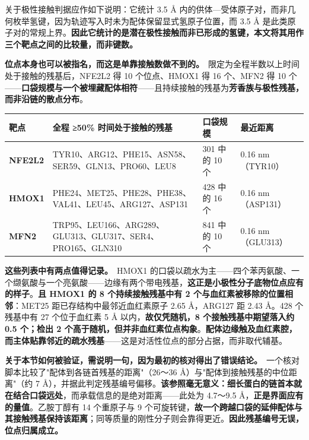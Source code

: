 \documentclass[UTF8,fontset=windows,11pt]{ctexart}
\begin{document}
关于极性接触判据应作如下说明：它统计 3.5 Å 内的供体—受体原子对，而非几何枚举氢键，因为轨迹写入时未为配体保留显式氢原子位置，而 3.5 Å 是此类原子对的常规上界。\textbf{因此它统计的是潜在极性接触而非已形成的氢键，本文将其用作三个靶点之间的比较量，而非键数。}

\textbf{位点本身也可以被指名，而这是单靠接触数做不到的。}\ 限定为全程半数以上时间处于接触的残基后，NFE2L2 得 10 个位点、HMOX1 得 16 个、MFN2 得 10 个——\textbf{口袋规模与一个被埋藏配体相符}——且持续接触的残基为\textbf{芳香族与极性残基，而非沿链的散点分布}。

\begin{center}
\small
\begin{longtable}{p{}p{}p{}p{}}
\hline
靶点 & 全程 ≥50\% 时间处于接触的残基 & 口袋规模 & 最近距离 \\
\hline
\textbf{NFE2L2} & TYR10、ARG12、PHE15、ASN58、SER59、GLN13、PRO60、LEU8 & 301 中的 10 个 & 0.16 nm（TYR10） \\
\textbf{HMOX1} & PHE24、MET25、PHE28、PHE38、VAL41、LEU45、ARG127、ASP131 & 428 中的 16 个 & 0.16 nm（ASP131） \\
\textbf{MFN2} & TRP95、LEU166、ARG289、GLU313、GLU317、SER4、PRO165、GLN310 & 841 中的 10 个 & 0.16 nm（GLU313） \\
\hline
\end{longtable}
\end{center}

\textbf{这些列表中有两点值得记录。}\ HMOX1 的口袋以疏水为主——四个苯丙氨酸、一个缬氨酸与一个亮氨酸——边缘有两个带电残基，\textbf{这正是小极性分子底物位点应有的样子}。\textbf{且 HMOX1 的 8 个持续接触残基中有 2 个与血红素被移除的位置相邻}：MET25 距已存结构中最邻近血红素原子 2.65 Å，ARG127 距 2.43 Å。428 个残基中有 27 个位于血红素 5 Å 以内，\textbf{故仅凭随机，8 个接触残基中期望落入约 0.5 个；检出 2 个高于随机，但并非血红素位点构象}。\textbf{配体边缘触及血红素腔，而主体贴靠邻近的疏水残基}——这是对活性位点的部分占据，而非取代辅基。

\textbf{关于本节如何被验证，需说明一句，因为最初的核对得出了错误结论。}\ 一个核对脚本比较了"配体到各链首残基的距离"（26～36 Å）与"配体到接触残基的中位距离"（约 7 Å），并据此判定残基编号偏移。\textbf{该参照毫无意义：细长蛋白的链首本就在结合口袋远处}，而承载信息的是绝对距离——此处为 4.7～9.5 Å，\textbf{正是界面应有的量值}。乙胺丁醇有 14 个重原子与 9 个可旋转键，\textbf{故一个跨越口袋的延伸配体与其接触残基保持该距离}；同等质量的刚性分子则会靠得更近。\textbf{因此残基编号无误，位点归属成立。}
\end{document}
